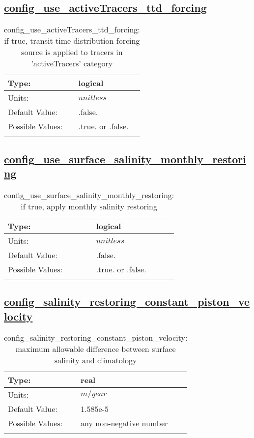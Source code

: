 \subsection[config\_use\_activeTracers\_ttd\_forcing]{\hyperref[sec:nm_tab_tracer_forcing_activeTracers]{config\_use\_activeTracers\_ttd\_forcing}}
\label{subsec:nm_sec_config_use_activeTracers_ttd_forcing}
\begin{center}
\begin{longtable}{| p{2.0in} || p{4.0in} |}
    \hline
    Type: & logical \\
    \hline
    Units: & $unitless$ \\
    \hline
    Default Value: & .false. \\
    \hline
    Possible Values: & .true. or .false. \\
    \hline
    \caption{config\_use\_activeTracers\_ttd\_forcing: if true, transit time distribution forcing source is applied to tracers in 'activeTracers' category}
\end{longtable}
\end{center}
\subsection[config\_use\_surface\_salinity\_monthly\_restoring]{\hyperref[sec:nm_tab_tracer_forcing_activeTracers]{config\_use\_surface\_salinity\_monthly\_restoring}}
\label{subsec:nm_sec_config_use_surface_salinity_monthly_restoring}
\begin{center}
\begin{longtable}{| p{2.0in} || p{4.0in} |}
    \hline
    Type: & logical \\
    \hline
    Units: & $unitless$ \\
    \hline
    Default Value: & .false. \\
    \hline
    Possible Values: & .true. or .false. \\
    \hline
    \caption{config\_use\_surface\_salinity\_monthly\_restoring: if true, apply monthly salinity restoring}
\end{longtable}
\end{center}
\subsection[config\_salinity\_restoring\_constant\_piston\_velocity]{\hyperref[sec:nm_tab_tracer_forcing_activeTracers]{config\_salinity\_restoring\_constant\_piston\_velocity}}
\label{subsec:nm_sec_config_salinity_restoring_constant_piston_velocity}
\begin{center}
\begin{longtable}{| p{2.0in} || p{4.0in} |}
    \hline
    Type: & real \\
    \hline
    Units: & $m/year$ \\
    \hline
    Default Value: & 1.585e-5 \\
    \hline
    Possible Values: & any non-negative number \\
    \hline
    \caption{config\_salinity\_restoring\_constant\_piston\_velocity: maximum allowable difference between surface salinity and climatology}
\end{longtable}
\end{center}

